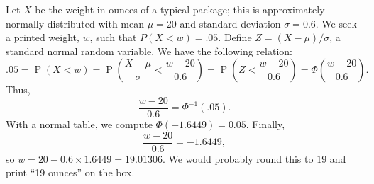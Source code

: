\documentclass[answers,11pt]{exam}
\DeclareMathOperator*{\Prob}{P}
\renewcommand{\Pr}{\Prob}
\begin{document}
\begin{questions}
\begin{solution}
Let $X$ be the weight in ounces of a typical package; this is approximately
normally distributed with mean $\mu = 20$ and standard deviation $\sigma =
0.6$.  We seek a printed weight, $w$, such that $P(X < w) = .05$.  Define
$Z = (X - \mu)/\sigma$, a standard normal random variable.  We have
the following relation:
\[
  .05
  = \Pr(X < w) 
  = \Pr\left(\frac{X - \mu}{\sigma} < \frac{w - 20}{0.6}\right)
  = \Pr\left(Z < \frac{w - 20}{0.6}\right)
  = \Phi\left(\frac{w - 20}{0.6}\right).
\]
Thus,
\[
  \frac{w - 20}{0.6} = \Phi^{-1}(.05).
\]
With a normal table, we compute $\Phi(-1.6449) = 0.05$.
Finally,
\[
  \frac{w - 20}{0.6} = -1.6449,
\]
so $w = 20 - 0.6 \times 1.6449 = 19.01306$.  We would probably round this to
$19$ and print ``19 ounces'' on the box.
\end{solution}



\end{questions}
\end{document}

